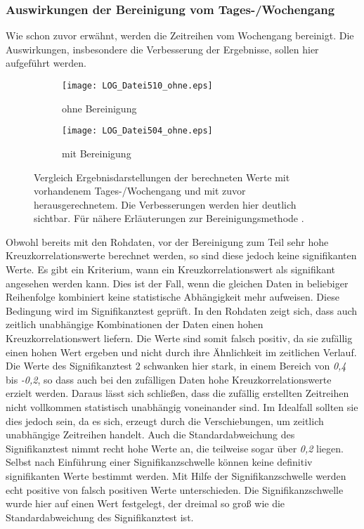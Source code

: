 \documentclass[fontsize=11pt, twoside, a4paper]{scrartcl}
\begin{document}
\subsubsection{Auswirkungen der Bereinigung vom Tages-/Wochengang}
Wie schon zuvor erwähnt, werden die Zeitreihen vom Wochengang bereinigt. Die Auswirkungen, insbesondere die Verbesserung der Ergebnisse, sollen hier aufgeführt werden.
\begin{figure}[H]
\centering
	\begin{minipage}[t]{0.45\textwidth}
		\begin{figure}[H]
		\texttt{[image: LOG\_Datei510\_ohne.eps]}
		\caption*{ohne Bereinigung}
		\end{figure}
	\end{minipage}
	\begin{minipage}[t]{0.45\textwidth}
		\begin{figure}[H]
		\texttt{[image: LOG\_Datei504\_ohne.eps]}
		\caption*{mit Bereinigung}
		\end{figure}
	\end{minipage}	
\caption{Vergleich Ergebnisdarstellungen der berechneten Werte mit vorhandenem Tages-/Wochengang und mit zuvor herausgerechnetem. Die Verbesserungen werden hier deutlich sichtbar. Für nähere Erläuterungen zur Bereinigungsmethode .}
\end{figure}
Obwohl bereits mit den Rohdaten, vor der Bereinigung zum Teil sehr hohe Kreuzkorrelationswerte berechnet werden, so sind diese jedoch keine signifikanten Werte. Es gibt ein Kriterium, wann ein Kreuzkorrelationswert als signifikant angesehen werden kann. Dies ist der Fall, wenn die gleichen Daten in beliebiger Reihenfolge kombiniert keine statistische Abhängigkeit mehr aufweisen. Diese Bedingung wird im Signifikanztest geprüft. In den Rohdaten zeigt sich, dass auch zeitlich unabhängige Kombinationen der Daten einen hohen Kreuzkorrelationswert liefern. Die Werte sind somit falsch positiv, da sie zufällig einen hohen Wert ergeben und nicht durch ihre Ähnlichkeit im zeitlichen Verlauf. Die Werte des Signifikanztest 2 schwanken hier stark, in einem Bereich von \textit{0,4} bis \textit{-0,2}, so dass auch bei den zufälligen Daten hohe Kreuzkorrelationswerte erzielt werden. Daraus lässt sich schließen, dass die zufällig erstellten Zeitreihen nicht vollkommen statistisch unabhängig voneinander sind. Im Idealfall sollten sie dies jedoch sein, da es sich, erzeugt durch die Verschiebungen, um zeitlich unabhängige Zeitreihen handelt. Auch die Standardabweichung des Signifikanztest nimmt recht hohe Werte an, die teilweise sogar über \textit{0,2} liegen. Selbst nach Einführung einer Signifikanzschwelle können keine definitiv signifikanten Werte bestimmt werden. Mit Hilfe der Signifikanzschwelle werden echt positive von falsch positiven Werte unterschieden. Die Signifikanzschwelle wurde hier auf einen Wert festgelegt, der dreimal so groß wie die Standardabweichung des Signifikanztest ist.\\ 
\end{document}
